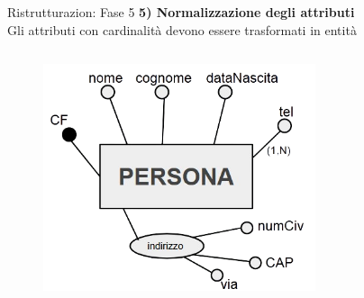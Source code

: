 \begin{frame}{Ristrutturazion: Fase 5}
\textbf{5) Normalizzazione degli attributi}
\\\vspace{2em}
Gli attributi con cardinalit\`a devono essere trasformati in entit\`a
\begin{columns}
        \begin{column}{0.5\textwidth}
            \begin{figure}[h]
        \centering
        \includegraphics[width=0.75\textwidth]{img/i10.png}
    \end{figure}
        \end{column}
        \begin{column}{0.5\textwidth}
        \end{column}
    \end{columns}
\end{frame}
